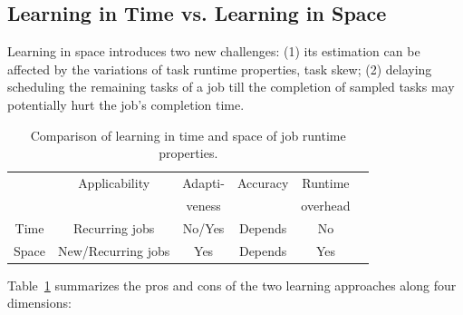 \subsection{Learning in Time vs. Learning in Space}
\label{sec:comparison}

Learning in space introduces two new challenges:
%
(1) its estimation can be affected by the variations of task runtime
properties, \ie task skew;
%
(2) delaying scheduling the remaining tasks of a job till the completion of
sampled tasks may potentially hurt the job's completion time.

\begin{table}[tp]
\caption{Comparison of learning in time and space of job runtime properties.}
\label{table:proscons}
\centering
{\small
\vspace{-0.1in}
\begin{tabular}{|c|c|c|c|c|c|}
\hline
                        & Applicability & Adapti- & Accuracy & Runtime \\
	                &               &         veness     &          & overhead\\
\hline
	Time & Recurring jobs & No/Yes & Depends  & No\\
\hline
	Space &New/Recurring jobs & Yes & Depends & Yes\\
\hline
\end{tabular}
}
\vspace{-0.1in}
\end{table}

Table~\ref{table:proscons} summarizes the pros and cons of the two
learning approaches along four dimensions:

